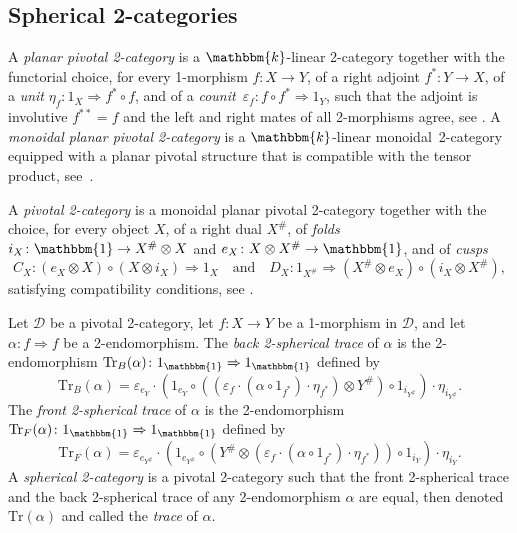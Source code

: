 \documentclass[a4paper, oneside]{amsart}
\numberwithin{equation}{subsection}
\theoremstyle{referencedlemma}
\theoremstyle{plain} %
\theoremstyle{remark}
\begin{document}
\subsection{Spherical 2-categories}\label{Subsection_Spherical 2-categories}A \emph{planar pivotal 2-category} is a $\mathbbm{k}$-linear 2-category  together with the functorial choice, for every 1-morphism $f\colon X \to Y$,  of a right adjoint $f^*\colon Y\to X$, of a \emph{unit} $\eta_f \colon 1_X\Rightarrow f^* \circ f$,  and of a \emph{counit}~$\varepsilon_f \colon f \circ f^*\Rightarrow 1_Y$,  such that the adjoint is involutive $f^{**} = f$ and the left and right mates of all 2-morphisms agree, see \cite[Definition 2.2.1]{douglas_fusion_2018}.  A \emph{monoidal planar pivotal 2-category} is a $\mathbbm{k}$-linear monoidal~\mbox{2-cate}\-gory equipped with a planar pivotal structure that is compatible with the tensor product, see~\cite[Definition~2.2.3]{douglas_fusion_2018}. 

A \emph{pivotal 2-category} is a monoidal planar pivotal 2-category together with the choice, for every object $X$, of a right dual $X^\#$, of \emph{folds} $i_X \colon \mathbbm{1}\to X^\#\otimes X$ and $e_X \colon X \otimes X^\#\to \mathbbm{1}$, and of \emph{cusps}
$$
C_X \colon (e_X \otimes X) \circ (X \otimes i_X) \Rightarrow 1_X \quad \text{and} \quad D_X \colon 1_{X^\#} \Rightarrow (X^\#\otimes e_X) \circ (i_X\otimes X^\#),
$$
satisfying compatibility conditions, see \cite[Definition 2.2.4]{douglas_fusion_2018}.

Let $\mathcal{D}$ be a pivotal 2-category, let $f\colon X \to Y$ be a 1-morphism in $\mathcal{D}$, and let~$\alpha\colon f \Rightarrow f$ be a 2-endomorphism.  The \emph{back 2-spherical trace} of $\alpha$ is the 2-endomorphism $\mathrm{Tr}_B(\alpha) \colon 1_{\mathbbm{1}} \Rightarrow 1_\mathbbm{1}$ defined by 
$$
\mathrm{Tr}_B(\alpha) = \varepsilon_{e_Y} \cdot \left( 1_{e_Y} \circ \left( \left(\varepsilon_f \cdot \left( \alpha \circ 1_{f^*} \right)\cdot \eta_{f^*} \right)\otimes Y^{\#} \right) \circ 1_{i_{Y^\#}} \right) \cdot \eta_{i_{Y^\#}}.
$$
The \emph{front 2-spherical trace} of $\alpha$ is the 2-endomorphism $\mathrm{Tr}_F(\alpha) \colon 1_{\mathbbm{1}} \Rightarrow 1_\mathbbm{1}$ defined by 
$$
\mathrm{Tr}_F(\alpha) = \varepsilon_{e_{Y^\#}} \cdot \left( 1_{e_{Y^\#}} \circ \left(Y^\#\otimes  \left(\varepsilon_f \cdot \left( \alpha \circ 1_{f^*} \right)\cdot \eta_{f^*} \right) \right) \circ 1_{i_{Y}} \right) \cdot \eta_{i_{Y}}.
$$
A \emph{spherical 2-category} is a pivotal 2-category such that the front 2-spherical trace and the back 2-spherical trace of any 2-endomorphism $\alpha$ are equal, then denoted $\mathrm{Tr}(\alpha)$ and called the \emph{trace} of $\alpha$. 
\end{document}
